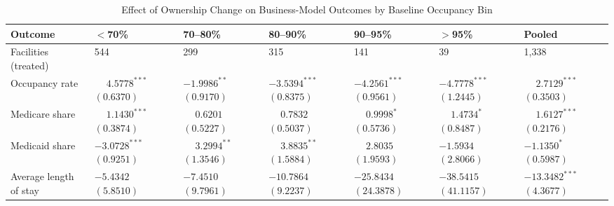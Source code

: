 \begin{table}[!ht]
\centering
\begin{threeparttable}
\caption{Effect of Ownership Change on Business-Model Outcomes by Baseline Occupancy Bin}
\label{tab:het-occupancy-bin}
\small
\setlength{\tabcolsep}{6pt}

\begin{tabularx}{\textwidth}{@{} l Y Y Y Y Y Y @{}}
\toprule
Outcome & $<$70\% & 70--80\% & 80--90\% & 90--95\% & $>$95\% & Pooled \\
\midrule
Facilities (treated) & 544 & 299 & 315 & 141 & 39 & 1,338 \\
\addlinespace[0.4em]
Occupancy rate & $\phantom{-}4.5778^{***}$ $(0.6370)$ & $-1.9986^{**}$ $(0.9170)$ & $-3.5394^{***}$ $(0.8375)$ & $-4.2561^{***}$ $(0.9561)$ & $-4.7778^{***}$ $(1.2445)$ & $\phantom{-}2.7129^{***}$ $(0.3503)$ \\
\addlinespace[0.4em]
Medicare share & $\phantom{-}1.1430^{***}$ $(0.3874)$ & $\phantom{-}0.6201$ $(0.5227)$ & $\phantom{-}0.7832$ $(0.5037)$ & $\phantom{-}0.9998^{*}$ $(0.5736)$ & $\phantom{-}1.4734^{*}$ $(0.8487)$ & $\phantom{-}1.6127^{***}$ $(0.2176)$ \\
\addlinespace[0.4em]
Medicaid share & $-3.0728^{***}$ $(0.9251)$ & $\phantom{-}3.2994^{**}$ $(1.3546)$ & $\phantom{-}3.8835^{**}$ $(1.5884)$ & $\phantom{-}2.8035$ $(1.9593)$ & $-1.5934$ $(2.8066)$ & $-1.1350^{*}$ $(0.5987)$ \\
\addlinespace[0.4em]
Average length of stay & $-5.4342$ $(5.8510)$ & $-7.4510$ $(9.7961)$ & $-10.7864$ $(9.2237)$ & $-25.8434$ $(24.3878)$ & $-38.5415$ $(41.1157)$ & $-13.3482^{***}$ $(4.3677)$ \\
\bottomrule
\end{tabularx}


\end{threeparttable}
\end{table}
